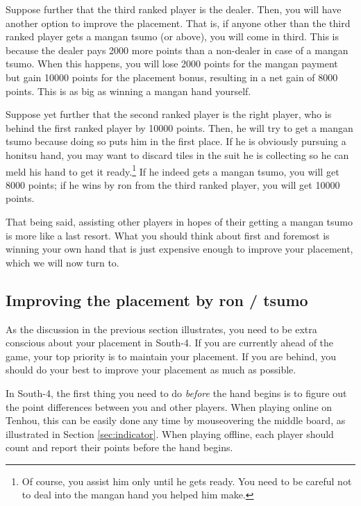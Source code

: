 \bigskip
Suppose further that the third ranked player is the dealer. Then, you will have another option to improve the placement. That is, if anyone other than the third ranked player gets a {\jap mangan tsumo} (or above), you will come in third. This is because the dealer pays 2000 more points than a non-dealer in case of a {\jap mangan tsumo}. When this happens, you will lose 2000 points for the {\jap mangan} payment but gain 10000 points for the placement bonus, resulting in a net gain of 8000 points. This is as big as winning a {\jap mangan} hand yourself.

\bigskip
Suppose yet further that the second ranked player is the right player, who is behind the first ranked player by 10000 points. Then, he will try to get a {\jap mangan tsumo} because doing so puts him in the first place. If he is obviously pursuing a {\jap honitsu} hand, you may want to discard tiles in the suit he is collecting so he can meld his hand to get it ready.\footnote{Of course, you assist him only until he gets ready. You need to be careful not to deal into the {\jap mangan} hand you helped him make.} If he indeed gets a {\jap mangan tsumo}, you will get 8000 points; if he wins by {\jap ron} from the third ranked player, you will get 10000 points. 

\bigskip
That being said, assisting other players in hopes of their getting a {\jap mangan tsumo} is more like a last resort. What you should think about first and foremost is winning your own hand that is just expensive enough to improve your placement, which we will now turn to.

\subsection*{Improving the placement by {\jap ron} / {\jap tsumo}}
As the discussion in the previous section illustrates, you need to be extra conscious about your placement in South-4. If you are currently ahead of the game, your top priority is to maintain your placement. If you are behind, you should do your best to improve your placement as much as possible. 

\bigskip
In South-4, the first thing you need to do \emph{before} the hand begins is to figure out the point differences between you and other players. When playing online on {\jap Tenhou}, this can be easily done any time by mouseovering the middle board, as illustrated in Section \ref{sec:indicator}. When playing offline, each player should count and report their points before the hand begins. 

